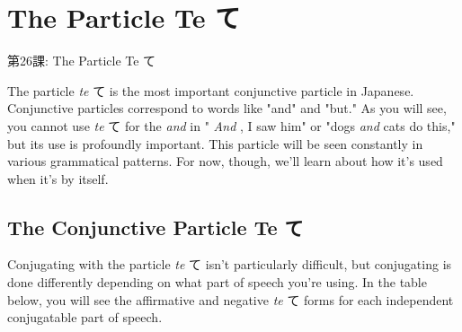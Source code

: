     
\chapter{The Particle Te て}

\begin{center}
\begin{Large}
第26課: The Particle Te て 
\end{Large}
\end{center}
 
\par{ The particle \emph{te }て is the most important conjunctive particle in Japanese. Conjunctive particles correspond to words like "and" and "but." As you will see, you cannot use \emph{te }て for the \emph{and }in " \emph{And }, I saw him" or "dogs \emph{and }cats do this," but its use is profoundly important. This particle will be seen constantly in various grammatical patterns. For now, though, we'll learn about how it's used when it's by itself. }
      
\section{The Conjunctive Particle Te て}
 
\par{ Conjugating with the particle \emph{te }て isn't particularly difficult, but conjugating is done differently depending on what part of speech you're using. In the table below, you will see the affirmative and negative \emph{te }て forms for each independent conjugatable part of speech. }

